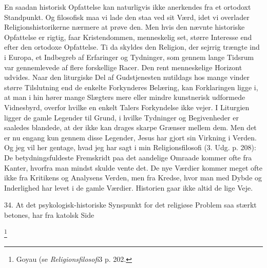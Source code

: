 \documentclass[12pt]{article}
\newcommand{\apage}[1]{\marginnote{\footnotesize\textit{[#1]}}}
\begin{document}
En saadan historisk Opfattelse kan naturligvis ikke anerkendes fra et ortodoxt
Standpunkt. Og filosofisk maa vi lade den staa ved sit Værd, idet vi overlader
Religionshistorikerne nærmere at prøve den. Men hvis den nævnte historiske
Opfattelse er rigtig, faar Kristendommen, menneskelig set, større Interesse end
efter den ortodoxe Opfattelse. Ti da skyldes den Religion, der sejrrig trængte
ind i Europa, et Indbegreb af Erfaringer og Tydninger, som gennem lange Tidsrum
var gennemlevede af flere forskellige Racer. Den rent menneskelige Horizont
udvides. Naar den liturgiske Del af Gudstjenesten nutildags hos mange vinder
større Tilslutning end de enkelte Forkynderes Belæring, kan Forklaringen ligge
i, at man i hin hører mange Slægters mere eller mindre kunstnerisk udformede
Vidnesbyrd, overfor hvilke en enkelt Talers Forkyndelse ikke vejer. I Liturgien
ligger de gamle Legender til Grund, i hvilke Tydninger og Begivenheder er
saaledes blandede, at der ikke kan drages skarpe Grænser mellem dem. Men det er
nu engang kun gennem disse Legender, Jesus har gjort sin Virkning i Verden. Og
jeg vil her gentage, hvad jeg har sagt i min Religionsfilosofi (3. Udg. p.
208): \guillemotright{}De betydningsfuldeste Fremskridt paa det aandelige
Omraade kommer ofte fra Kanter, hvorfra man mindst skulde vente det. De nye
Værdier kommer meget ofte ikke fra Kritikens
\setcounter{footnote}{0}%
\apage{114}og Analysens Verden, men fra Kredse, hvor man med Dybde og
Inderlighed har levet i de gamle Værdier. Historien gaar ikke altid de lige
Veje.\guillemotleft{}

34. At det psykologisk-historiske Synspunkt for det religiøse Problem saa
stærkt betones, har fra katolsk Side

         \footnote{Goyau (se \textit{Religionsfilosofi}3 p. 202.}
\end{document}
